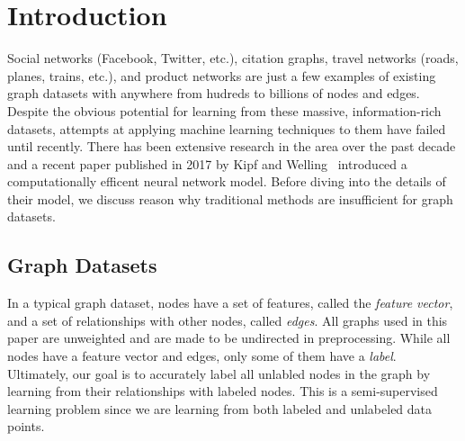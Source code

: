 \section{Introduction} \label{sec:introduction}

Social networks (Facebook, Twitter, etc.), citation graphs, travel networks (roads, planes, trains, etc.), and product networks are just a few examples of existing graph datasets with anywhere from hudreds to billions of nodes and edges. Despite the obvious potential for learning from these massive, information-rich datasets, attempts at applying machine learning techniques to them have failed until recently. There has been extensive research in the area over the past decade and a recent paper published in 2017 by Kipf and Welling~\cite{Kipf2016} introduced a computationally efficent neural network model. Before diving into the details of their model, we discuss reason why traditional methods are insufficient for graph datasets. 

\subsection{Graph Datasets} \label{sec:network-datasets}
In a typical graph dataset, nodes have a set of features, called the \textit{feature vector}, and a set of relationships with other nodes, called \textit{edges}. All graphs used in this paper are unweighted and are made to be undirected in preprocessing. While all nodes have a feature vector and edges, only some of them have a \textit{label}. Ultimately, our goal is to accurately label all unlabled nodes in the graph by learning from their relationships with labeled nodes. This is a semi-supervised learning problem since we are learning from both labeled and unlabeled data points. 


